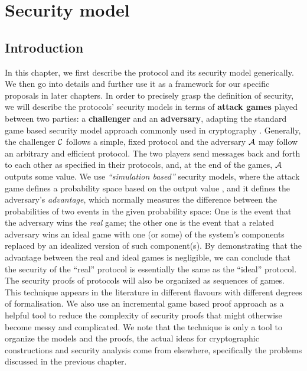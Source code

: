 
\chapter{Security model}
\ifpdf
    \graphicspath{{Chapter3/Figs/Raster/}{Chapter3/Figs/PDF/}{Chapter3/Figs/}}
\else
    \graphicspath{{Chapter3/Figs/Vector/}{Chapter3/Figs/}}
\fi

\section{Introduction}
\label{sec:syntaxModel}
In this chapter, we first describe the protocol and its security model
generically.  We then go into details and further use it as a framework for our
specific proposals in later chapters. In order to precisely grasp the definition
of security, we will describe the protocols' security models in terms of
\textbf{attack games} played between two parties: a \textbf{challenger} and an
\textbf{adversary}, adapting the standard game based security model approach
commonly used in cryptography \cite{boneh2008graduate} . Generally, the
challenger \(\mathcal{C}\) follows a simple, fixed protocol and the adversary
\(\mathcal{A}\) may follow an arbitrary and efficient protocol. The two players
send messages back and forth to each other as specified in their protocols, and,
at the end of the games, \(\mathcal{A}\) outputs some value. We use
\textit{``simulation based''} security models, where the attack game defines a
probability space based on the output value , and it defines the adversary's
\textit{advantage}, which normally measures the difference between the
probabilities of two events in the given probability space: One is the event
that the adversary wins the \textit{real} game; the other one is the event that
a related adversary wins an ideal game with one (or some) of the system's
components replaced by an idealized version of such component(s). By
demonstrating that the advantage between the real and ideal games is negligible,
we can conclude that the security of the ``real'' protocol is essentially the
same as the ``ideal'' protocol. The security proofs of protocols will also be
organized as sequences of games. This technique appears in the literature in
different flavours with different degrees of formalisation. We also use an
incremental game based proof approach \cite{shoup2004sequences} as a helpful
tool to reduce the complexity of security proofs that might otherwise become
messy and complicated. We note that the technique is only a tool to organize the
models and the proofs, the actual ideas for cryptographic constructions and
security analysis come from elsewhere, specifically the problems discussed in
the previous chapter.

